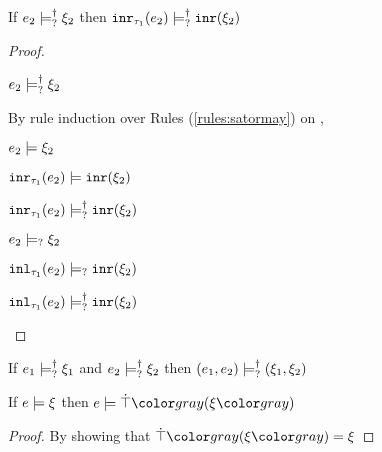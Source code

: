 \begin{lem}
  \label{lem:satormay-inr}
  If $e_2 \models_{?}^{\dag} \xi_2$ then $\mathtt{inr}_{\tau_1}({e_2}) \models_{?}^{\dag} \mathtt{inr}(\xi_2)$
\end{lem}
\begin{proof}
  \begin{pfsteps*}
  \item $e_2 \models_{?}^{\dag} \xi_2$  
  \end{pfsteps*}
  By rule induction over Rules (\ref{rules:satormay}) on ,
  \begin{byCases}
  \item[\text{(\ref{rule:CSMSSat})}]
    \begin{pfsteps*}
    \item $e_2 \models \xi_2$  
    \item $\mathtt{inr}_{\tau_1}({e_2}) \models \mathtt{inr}(\xi_2)$  
    \item $\mathtt{inr}_{\tau_1}({e_2}) \models_{?}^{\dag} \mathtt{inr}(\xi_2)$ 
    \end{pfsteps*}

  \item[\text{(\ref{rule:CSMSMay})}]
    \begin{pfsteps*}
    \item $e_2 \models_{?} \xi_2$  
    \item $\mathtt{inl}_{\tau_1}({e_2}) \models_{?} \mathtt{inr}(\xi_2)$  
    \item $\mathtt{inl}_{\tau_1}({e_2}) \models_{?}^{\dag} \mathtt{inr}(\xi_2)$ 
    \end{pfsteps*}
  \end{byCases}
  \resetpfcounter
\end{proof}

\begin{lem}
  \label{lem:satormay-pair}
  If $e_1 \models_{?}^{\dag} \xi_1$ and $e_2 \models_{?}^{\dag} \xi_2$ then $(e_1 , e_2) \models_{?}^{\dag} (\xi_1 , \xi_2)$
\end{lem}

\begin{lem}
  \label{lem:satisfy-truify}
  If $e \models \xi$ then $\csatisfy{e}{\ctruify{\xi}}$
\end{lem}
\begin{proof}
  By showing that $\ctruify{\xi} = \xi$
\end{proof}

